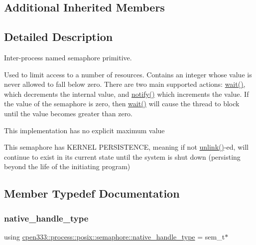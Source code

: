 \subsection*{Additional Inherited Members}


\subsection{Detailed Description}
Inter-\/process named semaphore primitive. 

Used to limit access to a number of resources. Contains an integer whose value is never allowed to fall below zero. There are two main supported actions\+: \hyperlink{classcpen333_1_1process_1_1posix_1_1semaphore_a1cf2d5f5922ab6358061dd3ac7121cf9}{wait()}, which decrements the internal value, and \hyperlink{classcpen333_1_1process_1_1posix_1_1semaphore_a1b9043106c5da18ad152bc83e3de1750}{notify()} which increments the value. If the value of the semaphore is zero, then \hyperlink{classcpen333_1_1process_1_1posix_1_1semaphore_a1cf2d5f5922ab6358061dd3ac7121cf9}{wait()} will cause the thread to block until the value becomes greater than zero.

This implementation has no explicit maximum value

This semaphore has K\+E\+R\+N\+EL P\+E\+R\+S\+I\+S\+T\+E\+N\+CE, meaning if not \hyperlink{classcpen333_1_1process_1_1posix_1_1semaphore_aa6064e2c4b4b7282cc5e6eda877ee1bb}{unlink()}-\/ed, will continue to exist in its current state until the system is shut down (persisting beyond the life of the initiating program) 

\subsection{Member Typedef Documentation}
\mbox{\label{classcpen333_1_1process_1_1posix_1_1semaphore_ad63150e5c8c196a84a7b214462756f1a}} 
\subsubsection{\texorpdfstring{native\+\_\+handle\+\_\+type}{native\_handle\_type}}
{\footnotesize\ttfamily using \hyperlink{classcpen333_1_1process_1_1posix_1_1semaphore_ad63150e5c8c196a84a7b214462756f1a}{cpen333\+::process\+::posix\+::semaphore\+::native\+\_\+handle\+\_\+type} =  sem\+\_\+t$\ast$}



